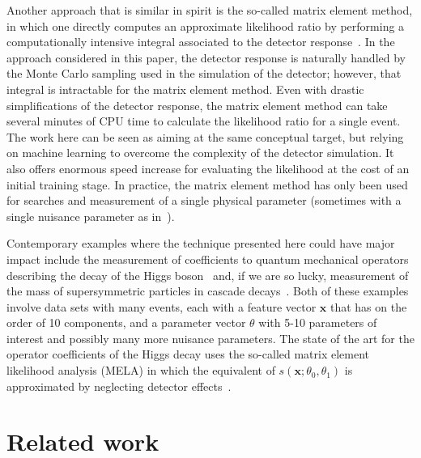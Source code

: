 \documentclass[12pt]{article}
\numberwithin{equation}{section}
\theoremstyle{plain}
\begin{document}
Another approach that is similar in spirit is the so-called matrix element
method, in which one  directly computes an approximate likelihood ratio by
performing a computationally intensive integral associated to the detector
response~\citep{Volobouev:2011vb}. In the approach considered in this paper, the
detector response is naturally handled by the Monte Carlo sampling used in the
simulation of the detector; however, that integral is intractable for the matrix
element method. Even with drastic simplifications of the detector response, the
matrix element method can take several minutes of CPU time to calculate the
likelihood ratio for a single event. The work here can be seen as aiming
at the same conceptual target, but relying on machine learning to overcome the
complexity of the detector simulation. It also offers enormous speed increase
for evaluating the likelihood at the cost of an initial training stage. In
practice, the matrix element method has only been used for searches and
measurement of a single physical parameter (sometimes with a single nuisance
parameter as in~\citep{Aaltonen:2010yz}).

Contemporary examples where the technique presented here could have major impact
include the measurement of coefficients to quantum mechanical operators
describing the decay of the Higgs boson~\citep{Chen:2014pia} and, if we are so
lucky, measurement of the mass of supersymmetric particles in cascade
decays~\citep{Allanach:2000kt}.  Both of these examples involve data sets with
many events, each with a feature vector $\mathbf{x}$ that has on the order of 10
components, and a parameter vector $\theta$ with 5-10 parameters of interest and
possibly many more nuisance parameters. The state of the art for the operator
coefficients of the Higgs decay uses the so-called matrix element likelihood
analysis (MELA) in which the equivalent of $s(\mathbf{x}; \theta_0, \theta_1)$ is
approximated by neglecting detector effects~\citep{Gao:2010qx,Bolognesi:2012mm}.



\section{Related work}
\label{sec:related}
\end{document}
